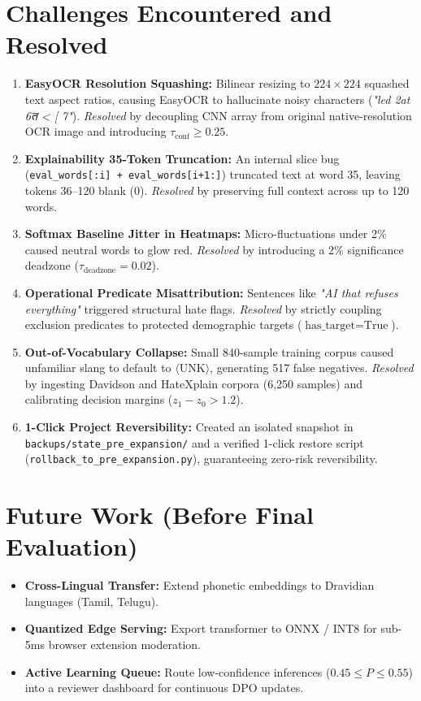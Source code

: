 \documentclass[10pt,twocolumn]{article}
\begin{document}
\section{Challenges Encountered and Resolved}
\begin{enumerate}
    \item \textbf{EasyOCR Resolution Squashing:} Bilinear resizing to $224 \times 224$ squashed text aspect ratios, causing EasyOCR to hallucinate noisy characters (\textit{"led 2at 6त < [ 7"}). \textit{Resolved} by decoupling CNN array from original native-resolution OCR image and introducing $\tau_{\text{conf}} \ge 0.25$.
    \item \textbf{Explainability 35-Token Truncation:} An internal slice bug (\texttt{eval\_words[:i] + eval\_words[i+1:]}) truncated text at word 35, leaving tokens 36--120 blank ($0$). \textit{Resolved} by preserving full context across up to 120 words.
    \item \textbf{Softmax Baseline Jitter in Heatmaps:} Micro-fluctuations under 2\% caused neutral words to glow red. \textit{Resolved} by introducing a 2\% significance deadzone ($\tau_{\text{deadzone}} = 0.02$).
    \item \textbf{Operational Predicate Misattribution:} Sentences like \textit{"AI that refuses everything"} triggered structural hate flags. \textit{Resolved} by strictly coupling exclusion predicates to protected demographic targets ($\text{has\_target} = \text{True}$).
    \item \textbf{Out-of-Vocabulary Collapse:} Small 840-sample training corpus caused unfamiliar slang to default to $\langle\text{UNK}\rangle$, generating 517 false negatives. \textit{Resolved} by ingesting Davidson and HateXplain corpora (6,250 samples) and calibrating decision margins ($z_1 - z_0 > 1.2$).
    \item \textbf{1-Click Project Reversibility:} Created an isolated snapshot in \texttt{backups/state\_pre\_expansion/} and a verified 1-click restore script (\texttt{rollback\_to\_pre_expansion.py}), guaranteeing zero-risk reversibility.
\end{enumerate}

\section{Future Work (Before Final Evaluation)}
\begin{itemize}
    \item \textbf{Cross-Lingual Transfer:} Extend phonetic embeddings to Dravidian languages (Tamil, Telugu).
    \item \textbf{Quantized Edge Serving:} Export transformer to ONNX / INT8 for sub-5ms browser extension moderation.
    \item \textbf{Active Learning Queue:} Route low-confidence inferences ($0.45 \le P \le 0.55$) into a reviewer dashboard for continuous DPO updates.
\end{itemize}
\end{document}
